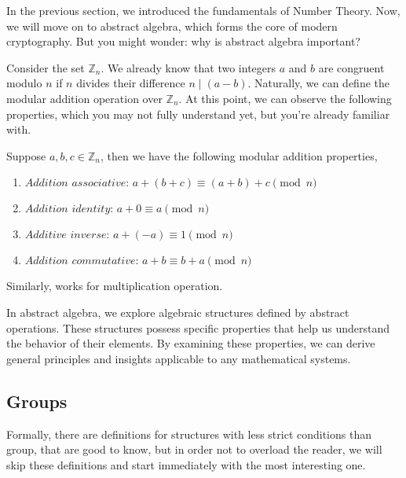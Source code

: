 \documentclass[../lecture-notes-148x210.tex]{subfiles}
\begin{document}
In the previous section, we introduced the fundamentals of Number Theory. 
Now, we will move on to abstract algebra, which forms the core of modern 
cryptography. But you might wonder: why is abstract algebra important? 

Consider the set $\mathbb{Z}_n$. We already know that two integers $a$ and 
$b$ are congruent modulo $n$ if $n$ divides their difference $n \mid (a - b)$. 
Naturally, we can define the modular addition operation over $\mathbb{Z}_n$. 
At this point, we can observe the following properties, which you may not fully 
understand yet, but you're already familiar with. 

\begin{lemma}
    Suppose $a, b, c \in \mathbb{Z}_n$, then we have the following modular addition properties,

    \begin{enumerate}
        \item $\textit{Addition associative: } a + (b + c) \equiv (a + b) + c \pmod{n}$
        \item $\textit{Addition identity: } a + 0 \equiv a \pmod{n}$
        \item $\textit{Additive inverse: } a + (-a) \equiv 1 \pmod{n}$
        \item $\textit{Addition commutative: } a + b \equiv b + a \pmod{n}$
    \end{enumerate}

    Similarly, works for multiplication operation. 
\end{lemma}

In abstract algebra, we explore algebraic structures defined by abstract operations. These 
structures possess specific properties that help us understand the behavior of their elements.
By examining these properties, we can derive general principles and insights applicable to 
any mathematical systems.

\subsection{Groups}

Formally, there are definitions for structures with less strict conditions than group,
that are good to know, but in order not to overload the reader, 
we will skip these definitions and start immediately with the most interesting one.
\end{document}
